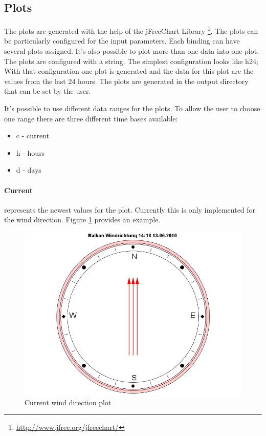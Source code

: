 \subsection{Plots} %
\label{sub:plots}
The plots are generated with the help of the jFreeChart Library \footnote{\url{http://www.jfree.org/jfreechart/}}.
The plots can be particularly configured for the input parameters. Each binding can have several plots assigned. It's also possible to plot more than one data into one plot. The plots are configured with a string. The simplest configuration looks like {\C h24;} With that configuration one plot is generated and the data for this plot are the values from the last 24 hours. The plots are generated in the output directory that can be set by the user.

It's possible to use different data ranges for the plots. To allow the user to choose one range there are three different time bases available:
\begin{itemize}
	\item c - current
	\item h - hours
	\item d - days
\end{itemize}

\paragraph{Current} %
\label{par:current}
represents the newest values for the plot. Currently this is only implemented for the wind direction. Figure \ref{fig:current} provides an example.
\begin{figure}[ht]
    \centering
    \includegraphics[width=0.9\linewidth]{master/plot_examplec.png}
    \caption{Current wind direction plot}
    \label{fig:current}
\end{figure}

